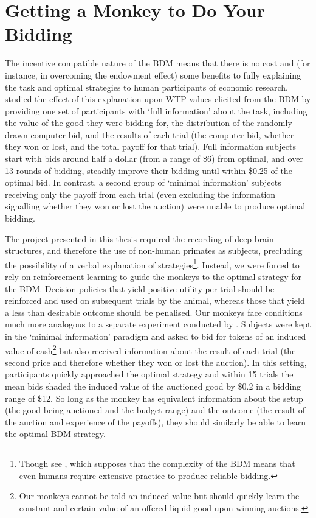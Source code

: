\clearpage
\section{Getting a Monkey to Do Your Bidding}

The incentive compatible nature of the BDM means that there is no cost and (for instance, in overcoming the endowment effect) some benefits to fully explaining the task and optimal strategies to human participants of economic research. \cite{irwinPayoffDominanceVs1998} studied the effect of this explanation upon WTP values elicited from the BDM by providing one set of participants with ‘full information’ about the task, including the value of the good they were bidding for, the distribution of the randomly drawn computer bid, and the results of each trial (the computer bid, whether they won or lost, and the total payoff for that trial). Full information subjects start with bids around half a dollar (from a range of \$6) from optimal, and over 13 rounds of bidding, steadily improve their bidding until within \$0.25 of the optimal bid. In contrast, a second group of ‘minimal information’ subjects receiving only the payoff from each trial (even excluding the information signalling whether they won or lost the auction) were unable to produce optimal bidding.

The project presented in this thesis required the recording of deep brain structures, and therefore the use of non-human primates as subjects, precluding the possibility of a verbal explanation of strategies\footnote{Though see \cite{hamukwalaDesignFactorsInfluencing2019}, which supposes that the complexity of the BDM means that even humans require extensive practice to produce reliable bidding.}. Instead, we were forced to rely on reinforcement learning to guide the monkeys to the optimal strategy for the BDM. Decision policies that yield positive utility per trial should be reinforced and used on subsequent trials by the animal, whereas those that yield a less than desirable outcome should be penalised. Our monkeys face conditions much more analogous to a separate experiment conducted by \cite{shogrenAuctionMechanismsMeasurement2001}. Subjects were kept in the ‘minimal information’ paradigm and asked to bid for tokens of an induced value of cash\footnote{Our monkeys cannot be told an induced value but should quickly learn the constant and certain value of an offered liquid good upon winning auctions.} but also received information about the result of each trial (the second price and therefore whether they won or lost the auction). In this setting, participants quickly approached the optimal strategy and within 15 trials the mean bids shaded the induced value of the auctioned good by \$0.2 in a bidding range of \$12. So long as the monkey has equivalent information about the setup (the good being auctioned and the budget range) and the outcome (the result of the auction and experience of the payoffs), they should similarly be able to learn the optimal BDM strategy.

